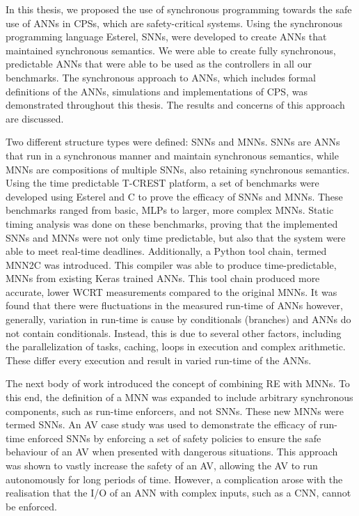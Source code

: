 In this thesis, we proposed the use of synchronous programming towards the safe use of \acp{ANN} in \acp{CPS}, which are safety-critical systems.
Using the synchronous programming language Esterel, \acp{SNN}, were developed to create \acp{ANN} that maintained synchronous semantics.
We were able to create fully synchronous, predictable \acp{ANN} that were able to be used as the controllers in all our benchmarks.
The synchronous approach to \acp{ANN}, which includes formal definitions of the \acp{ANN}, simulations and implementations of \ac{CPS}, was demonstrated throughout this thesis.
The results and concerns of this approach are discussed.

Two different structure types were defined: \acp{SNN} and \acp{MNN}.
\acp{SNN} are \acp{ANN} that run in a synchronous manner and maintain synchronous semantics, while \acp{MNN} are compositions of multiple \acp{SNN}, also retaining synchronous semantics.
Using the time predictable T-CREST platform, a set of benchmarks were developed using Esterel and C to prove the efficacy of \acp{SNN} and \acp{MNN}. 
These benchmarks ranged from basic, \acp{MLP} to larger, more complex \acp{MNN}.
Static timing analysis was done on these benchmarks, proving that the implemented \acp{SNN} and \acp{MNN} were not only time predictable, but also that the system were able to meet real-time deadlines.
Additionally, a Python tool chain, termed \ac{MNN2C} was introduced.
This compiler was able to produce time-predictable, \acp{MNN} from existing Keras trained \acp{ANN}.
This tool chain produced more accurate, lower \ac{WCRT} measurements compared to the original \acp{MNN}.
It was found that there were fluctuations in the measured run-time of \acp{ANN} however, generally, variation in run-time is cause by conditionals (branches) and \acp{ANN} do not contain conditionals.
Instead, this is due to several other factors, including the parallelization of tasks, caching, loops in execution and complex arithmetic. 
These differ every execution and result in varied run-time of the \acp{ANN}.

The next body of work introduced the concept of combining \ac{RE} with \acp{MNN}.
To this end, the definition of a \ac{MNN} was expanded to include arbitrary synchronous components, such as run-time enforcers, and not \acp{SNN}.
These new \acp{MNN} were termed \acp{SNN}.
An \ac{AV} case study was used to demonstrate the efficacy of run-time enforced \acp{SNN} by enforcing a set of safety policies to ensure the safe behaviour of an \ac{AV} when presented with dangerous situations.
This approach was shown to vastly increase the safety of an \ac{AV}, allowing the \ac{AV} to run autonomously for long periods of time.
However, a complication arose with the realisation that the I/O of an \ac{ANN} with complex inputs, such as a \ac{CNN}, cannot be enforced.

